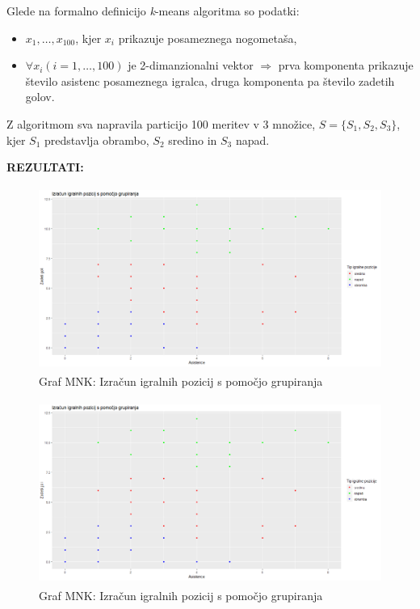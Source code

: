 \documentclass[11pt, a4paper]{article}
\begin{document}
\noindent Glede na formalno definicijo \textsl{k}-means algoritma so podatki:
\begin{itemize}
	\item $x_1,\ldots,x_{100}$, kjer $x_i$ prikazuje posameznega nogometaša,
	\item $\forall x_i (i = 1,\ldots,100)$ je 2-dimanzionalni vektor $\Rightarrow$  prva komponenta prikazuje število asistenc posameznega igralca, druga komponenta pa število zadetih golov.\\
\end{itemize}
Z algoritmom sva napravila particijo 100 meritev v 3 množice, $S = \{S_1, S_2, S_3\}$, kjer $S_1$ predstavlja obrambo, $S_2$ sredino in $S_3$ napad.

\vspace{0.5 cm}

\noindent \textbf{REZULTATI:} \\

\begin{figure}[h]
\caption{Graf MNK: Izračun igralnih pozicij s pomočjo grupiranja}
\centering
\includegraphics[width=12cm, height=6cm]{grafMNKoutgoli}
\end{figure}

\begin{figure}[h]
\caption{Graf MNK: Izračun igralnih pozicij s pomočjo grupiranja}
\centering
\includegraphics[width=12cm, height=6cm]{grafManhattanoutgoli}
\end{figure}
\end{document}
